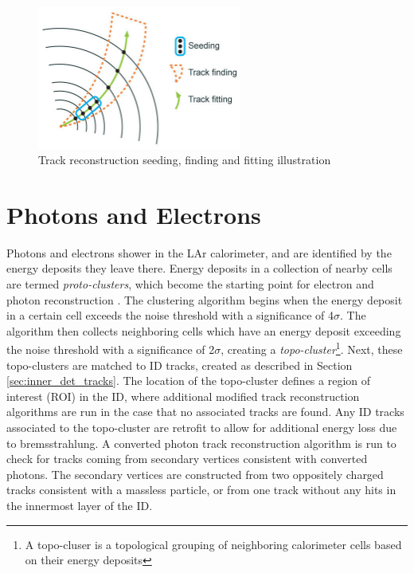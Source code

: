 \begin{figure}
        \centering
	\includegraphics[width=0.6\textwidth]{figures/ch5/track_reco}
	\caption{Track reconstruction seeding, finding and fitting illustration \cite{track_finding}}
	\label{fig:track_reco}
\end{figure}

\section{Photons and Electrons}
Photons and electrons shower in the LAr calorimeter, and are identified by the energy deposits they leave there. Energy deposits in a collection of nearby cells are termed \textit{proto-clusters}, which become the starting point for electron and photon reconstruction \cite{electron_photon}. The clustering algorithm begins when the energy deposit in a certain cell exceeds the noise threshold with a significance of 4$\sigma$. The algorithm then collects neighboring cells which have an energy deposit exceeding the noise threshold with a significance of 2$\sigma$, creating a \textit{topo-cluster}\footnote{A topo-cluser is a topological grouping of neighboring calorimeter cells based on their energy deposits}. Next, these topo-clusters are matched to ID tracks, created as described in Section \ref{sec:inner_det_tracks}. The location of the topo-cluster defines a region of interest (ROI) in the ID, where additional modified track reconstruction algorithms are run in the case that no associated tracks are found. Any ID tracks associated to the topo-cluster are retrofit to allow for additional energy loss due to bremsstrahlung. A converted photon track reconstruction algorithm is run to check for tracks coming from secondary vertices consistent with converted photons. The secondary vertices are constructed from two oppositely charged tracks consistent with a massless particle, or from one track without any hits in the innermost layer of the ID. \par

